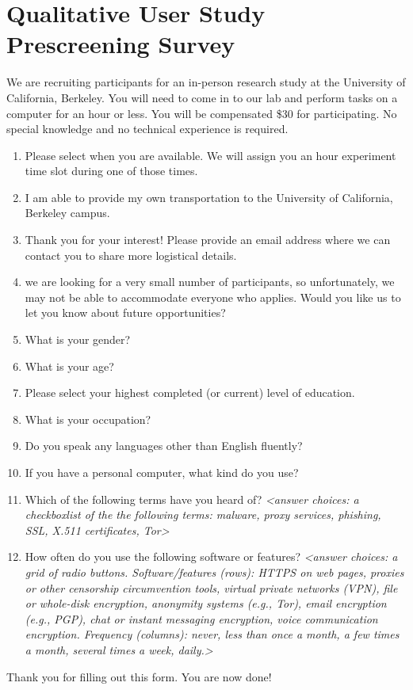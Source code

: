 \documentclass[USenglish,oneside,twocolumn]{article}
\begin{document}
\section{Qualitative User Study Prescreening Survey} 
\label{qualitative-prescreening}
We are recruiting participants for an in-person research study at the University of California, Berkeley. You will need to come in to our lab and perform tasks on a computer for an hour or less. You will be compensated \$30 for participating. No special knowledge and no technical experience is required.\\

\begin{enumerate}
\item{Please select when you are available. We will assign you an hour experiment time slot during one of those times.}
\item{I am able to provide my own transportation to the University of California, Berkeley campus.}
\item{Thank you for your interest! Please provide an email address where we can contact you to share more logistical details.}
\item{we are looking for a very small number of participants, so unfortunately, we may not be able to accommodate everyone who applies. Would you like us to let you know about future opportunities?}
\item{What is your gender?}
\item{What is your age?}
\item{Please select your highest completed (or current) level of education.}
\item{What is your occupation?} 
\item{Do you speak any languages other than English fluently?}
\item{If you have a personal computer, what kind do you use?}
\item{Which of the following terms have you heard of? \textit{<answer choices: a checkboxlist of the the following terms: malware, proxy services, phishing, SSL, X.511 certificates, Tor>}}
\item{How often do you use the following software or features? \textit{<answer choices: a grid of radio buttons. Software/features (rows): HTTPS on web pages, proxies or other censorship circumvention tools, virtual private networks (VPN), file or whole-disk encryption, anonymity systems (e.g., Tor), email encryption (e.g., PGP), chat or instant messaging encryption, voice communication encryption. Frequency (columns): never, less than once a month, a few times a month, several times a week, daily.>}}
\end{enumerate}
Thank you for filling out this form. You are now done!
\end{document}
